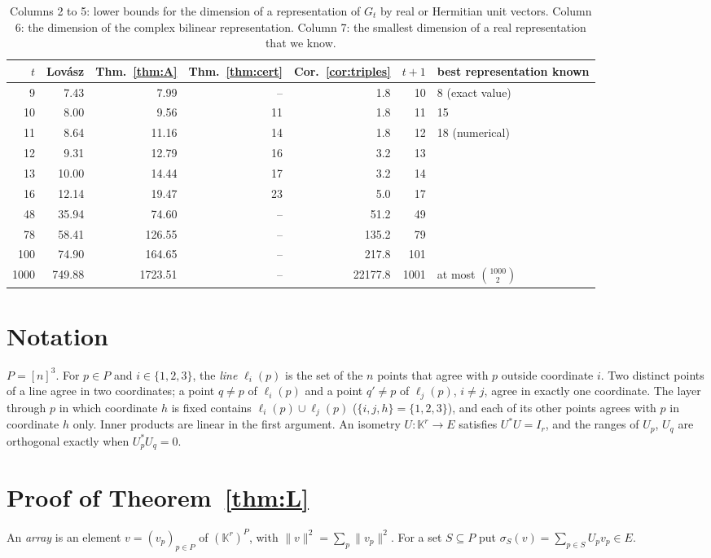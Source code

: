 \documentclass[11pt]{article}
\theoremstyle{remark}
\newcommand{\K}{\mathbb{K}}
\newcommand{\norm}[1]{\lVert #1\rVert}
\newcommand{\Gt}{G_t}
\begin{document}
\begin{table}[ht]\centering
\begin{tabular}{rrrrrrl}
\toprule
$t$ & Lov\'asz & Thm.~\ref{thm:A} & Thm.~\ref{thm:cert} & Cor.~\ref{cor:triples} & $t+1$ & best representation known\\
\midrule
9 & 7.43 & 7.99 & -- & 1.8 & 10 & 8 (exact value)\\
10 & 8.00 & 9.56 & 11 & 1.8 & 11 & 15\\
11 & 8.64 & 11.16 & 14 & 1.8 & 12 & 18 (numerical)\\
12 & 9.31 & 12.79 & 16 & 3.2 & 13 & \\
13 & 10.00 & 14.44 & 17 & 3.2 & 14 & \\
16 & 12.14 & 19.47 & 23 & 5.0 & 17 & \\
48 & 35.94 & 74.60 & -- & 51.2 & 49 & \\
78 & 58.41 & 126.55 & -- & 135.2 & 79 & \\
100 & 74.90 & 164.65 & -- & 217.8 & 101 & \\
1000 & 749.88 & 1723.51 & -- & 22177.8 & 1001 & at most $\binom{1000}{2}$\\
\bottomrule
\end{tabular}
\caption{Columns 2 to 5: lower bounds for the dimension of a representation of $\Gt$ by real or Hermitian unit
vectors. Column 6: the dimension of the complex bilinear representation. Column 7: the smallest dimension of a
real representation that we know.}
\label{tab:bounds}
\end{table}

\section{Notation}
$P=[n]^3$. For $p\in P$ and $i\in\{1,2,3\}$, the \emph{line} $\ell_i(p)$ is the set of the $n$ points that agree
with $p$ outside coordinate $i$. Two distinct points of a line agree in two coordinates; a point $q\ne p$ of
$\ell_i(p)$ and a point $q'\ne p$ of $\ell_j(p)$, $i\ne j$, agree in exactly one coordinate. The layer through
$p$ in which coordinate $h$ is fixed contains $\ell_i(p)\cup\ell_j(p)$ ($\{i,j,h\}=\{1,2,3\}$), and each of its
other points agrees with $p$ in coordinate $h$ only. Inner products are linear in the first argument. An
isometry $U\colon\K^r\to E$ satisfies $U^*U=I_r$, and the ranges of $U_p$, $U_q$ are orthogonal exactly when
$U_p^*U_q=0$.

\section{Proof of Theorem~\ref{thm:L}}\label{sec:proof}
An \emph{array} is an element $v=(v_p)_{p\in P}$ of $(\K^r)^P$, with $\norm v^2=\sum_p\norm{v_p}^2$. For a set
$S\subseteq P$ put $\sigma_S(v)=\sum_{p\in S}U_pv_p\in E$.
\end{document}
